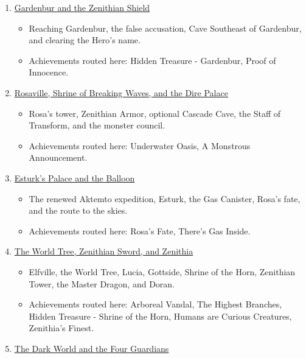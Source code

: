 \documentclass[
  american,
  10pt,
  letterpaper,
  oneside,
  open=any]{scrreprt}
\providecommand{\tightlist}{%
  \setlength{\itemsep}{0pt}\setlength{\parskip}{0pt}}
\begin{document}
\begin{enumerate}
  \begin{itemize}
  \tightlist
  \item
    Recruiting Panon, confronting the king's melancholy, and earning the
    first routed piece of Zenithian equipment.
  \item
    Achievements routed here: Not So Funny.
  \end{itemize}
\item
  \hyperref[gardenbur-and-the-zenithian-shield]{Gardenbur and the
  Zenithian Shield}

  \begin{itemize}
  \tightlist
  \item
    Reaching Gardenbur, the false accusation, Cave Southeast of
    Gardenbur, and clearing the Hero's name.
  \item
    Achievements routed here: Hidden Treasure - Gardenbur, Proof of
    Innocence.
  \end{itemize}
\item
  \hyperref[rosaville-shrine-of-breaking-waves-and-the-dire-palace]{Rosaville,
  Shrine of Breaking Waves, and the Dire Palace}

  \begin{itemize}
  \tightlist
  \item
    Rosa's tower, Zenithian Armor, optional Cascade Cave, the Staff of
    Transform, and the monster council.
  \item
    Achievements routed here: Underwater Oasis, A Monstrous
    Announcement.
  \end{itemize}
\item
  \hyperref[esturks-palace-and-the-balloon]{Esturk's Palace and the
  Balloon}

  \begin{itemize}
  \tightlist
  \item
    The renewed Aktemto expedition, Esturk, the Gas Canister, Rosa's
    fate, and the route to the skies.
  \item
    Achievements routed here: Rosa's Fate, There's Gas Inside.
  \end{itemize}
\item
  \hyperref[the-world-tree-zenithian-sword-and-zenithia]{The World Tree,
  Zenithian Sword, and Zenithia}

  \begin{itemize}
  \tightlist
  \item
    Elfville, the World Tree, Lucia, Gottside, Shrine of the Horn,
    Zenithian Tower, the Master Dragon, and Doran.
  \item
    Achievements routed here: Arboreal Vandal, The Highest Branches,
    Hidden Treasure - Shrine of the Horn, Humans are Curious Creatures,
    Zenithia's Finest.
  \end{itemize}
\item
  \hyperref[the-dark-world-and-the-four-guardians]{The Dark World and
  the Four Guardians}


\end{enumerate}
\end{document}
